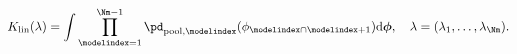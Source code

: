 \begin{equation}
  K_{\text{lin}}(\lambda) =
    \int
      \prod_{\modelindex = 1}^{\Nm - 1}
      \pd_{\text{pool}, \modelindex}(\phi_{\modelindex \cap \modelindex + 1})
    \text{d}\boldsymbol{\phi},
  \quad \lambda = (\lambda_{1}, \ldots, \lambda_{\Nm}).
\end{equation}

